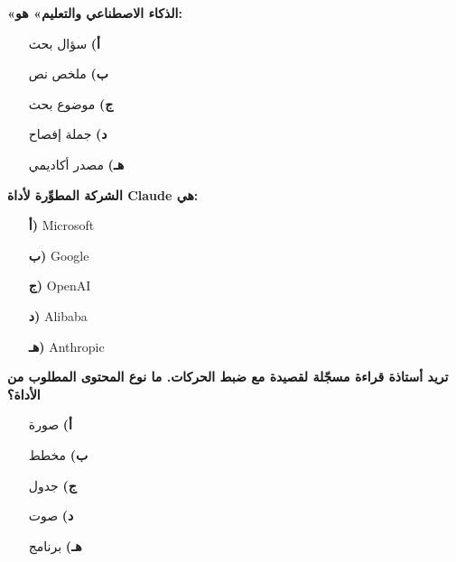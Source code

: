 \documentclass[11pt,a4paper]{article}
\begin{document}
\begin{multicols}{2}
\begin{minipage}{\linewidth}
\hangindent=0.7cm\textbf{«الذكاء الاصطناعي والتعليم» هو:}
\begin{itemize}[leftmargin=0.95cm, labelsep=4pt, itemsep=0pt, topsep=2pt, parsep=0pt]
  \item[\textbf{أ)}] سؤال بحث
  \item[\textbf{ب)}] ملخص نص
  \item[\textbf{ج)}] موضوع بحث
  \item[\textbf{د)}] جملة إفصاح
  \item[\textbf{هـ)}] مصدر أكاديمي
\end{itemize}
\end{minipage}\par\vspace{7pt plus 4pt}
\noindent\begin{minipage}{\linewidth}
\hangindent=0.7cm\textbf{الشركة المطوِّرة لأداة \textenglish{Claude} هي:}
\begin{itemize}[leftmargin=0.95cm, labelsep=4pt, itemsep=0pt, topsep=2pt, parsep=0pt]
  \item[\textbf{أ)}] \textenglish{Microsoft}
  \item[\textbf{ب)}] \textenglish{Google}
  \item[\textbf{ج)}] \textenglish{OpenAI}
  \item[\textbf{د)}] \textenglish{Alibaba}
  \item[\textbf{هـ)}] \textenglish{Anthropic}
\end{itemize}
\end{minipage}\par\vspace{7pt plus 4pt}
\noindent\begin{minipage}{\linewidth}
\hangindent=0.7cm\textbf{تريد أستاذة قراءة مسجّلة لقصيدة مع ضبط الحركات. ما نوع المحتوى المطلوب من الأداة؟}
\begin{itemize}[leftmargin=0.95cm, labelsep=4pt, itemsep=0pt, topsep=2pt, parsep=0pt]
  \item[\textbf{أ)}] صورة
  \item[\textbf{ب)}] مخطط
  \item[\textbf{ج)}] جدول
  \item[\textbf{د)}] صوت
  \item[\textbf{هـ)}] برنامج
\end{itemize}
\end{minipage}\par\vspace{7pt plus 4pt}

\end{multicols}
\end{document}
